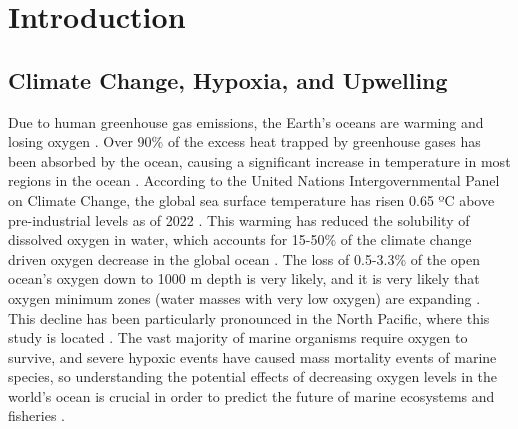 \documentclass[12pt,twoside]{reedthesis}
\begin{document}
	

  \mainmatter %
  \pagestyle{fancyplain} %


    \chapter*{Introduction}

	

\section{Climate Change, Hypoxia, and Upwelling}

Due to human greenhouse gas emissions, the Earth's oceans are warming and losing oxygen \autocite{Portner2022, Ito2017}. Over 90\% of the excess heat trapped by greenhouse gases has been absorbed by the ocean, causing a significant increase in temperature in most regions in the ocean \autocite{Bindoff2013}. According to the United Nations Intergovernmental Panel on Climate Change, the global sea surface temperature has risen 0.65 ºC above pre-industrial levels as of 2022 \autocite{Portner2022}. This warming has reduced the solubility of dissolved oxygen in water, which accounts for 15-50\% of the climate change driven oxygen decrease in the global ocean \autocite{Helm2011, Ito2017, Schmidtko2017, Li2020}. The loss of 0.5-3.3\% of the open ocean's oxygen down to 1000 m depth is very likely, and it is very likely that oxygen minimum zones (water masses with very low oxygen) are expanding \autocite{Bindoff2013}. This decline has been particularly pronounced in the North Pacific, where this study is located \autocite{Bindoff2013, Ito2017}. The vast majority of marine organisms require oxygen to survive, and severe hypoxic events have caused mass mortality events of marine species, so understanding the potential effects of decreasing oxygen levels in the world's ocean is crucial in order to predict the future of marine ecosystems and fisheries \autocite{Miller2002, Deutsch2024}. 
\end{document}
